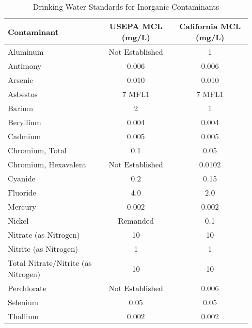 \documentclass{article}
\begin{document}
\begin{table}[ht]
\begin{center}
\begin{tabular}{|l|c|c|}
\hline
Contaminant                               & USEPA   MCL  (mg/L) & California   MCL  (mg/L) \\
\hline
Aluminum                                  & Not   Established   & 1                        \\
\hline
Antimony                                  & 0.006               & 0.006                    \\
\hline
Arsenic                                   & 0.010               & 0.010                    \\
\hline
Asbestos                                  & 7 MFL1              & 7 MFL1                   \\
\hline
Barium                                    & 2                   & 1                        \\
\hline
Beryllium                                 & 0.004               & 0.004                    \\
\hline
Cadmium                                   & 0.005               & 0.005                    \\
\hline
Chromium,   Total                         & 0.1                 & 0.05                     \\
\hline
Chromium,   Hexavalent                    & Not   Established   & 0.0102                   \\
\hline
Cyanide                                   & 0.2                 & 0.15                     \\
\hline
Fluoride                                  & 4.0                 & 2.0                      \\
\hline
Mercury                                   & 0.002               & 0.002                    \\
\hline
Nickel                                    & Remanded            & 0.1                      \\
\hline
Nitrate   (as   Nitrogen)                 & 10                  & 10                       \\
\hline
Nitrite   (as   Nitrogen)                 & 1                   & 1                        \\
\hline
Total   Nitrate/Nitrite   (as   Nitrogen) & 10                  & 10                       \\
\hline
Perchlorate                               & Not   Established   & 0.006                    \\
\hline
Selenium                                  & 0.05                & 0.05                     \\
\hline
Thallium                                  & 0.002               & 0.002                   \\
\hline
\end{tabular}
\caption{Drinking Water Standards for Inorganic Contaminants}
\end{center}
\end{table}
\end{document}
